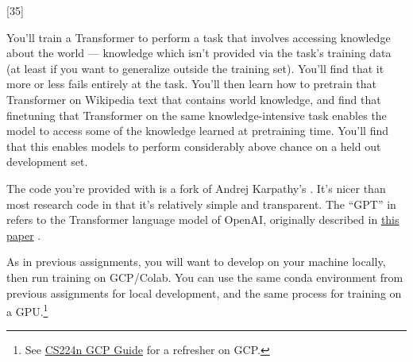 \graphicspath{ {images/} }


\newcommand{\Real}{\mathbb{R}}
\newcommand{\Int}{\mathbb{Z}}
\renewcommand\Re{\ensuremath{\text{Re}}} 



\newcommand{\henc}{\bh^{\text{enc}}}
\newcommand{\hencfw}[1]{\overrightarrow{\henc_{#1}}}
\newcommand{\hencbw}[1]{\overleftarrow{\henc_{#1}}}


\newcommand{\cenc}{\bc^{\text{enc}}}
\newcommand{\cencfw}[1]{\overrightarrow{\cenc_{#1}}}
\newcommand{\cencbw}[1]{\overleftarrow{\cenc_{#1}}}


\newcommand{\hdec}{\bh^{\text{dec}}}


\newcommand{\cdec}{\bc^{\text{dec}}}



\lstset{basicstyle=\ttfamily,columns=flexible,numbers=none}

[35]
\label{sec:char_enc}

You'll train a Transformer to perform a task that involves accessing knowledge about the world --- knowledge which isn't provided via the task's training data (at least if you want to generalize outside the training set). You'll find that it more or less fails entirely at the task.
You'll then learn how to pretrain that Transformer on Wikipedia text that contains world knowledge, and find that finetuning that Transformer on the same knowledge-intensive task enables the model to access some of the knowledge learned at pretraining time.
You'll find that this enables models to perform considerably above chance on a held out development set.

The code you're provided with is a fork of Andrej Karpathy's \href{https://github.com/karpathy/minGPT}{\mingpt}.
It's nicer than most research code in that it's relatively simple and transparent.
The ``GPT'' in \mingpt refers to the Transformer language model of OpenAI, originally described in \href{https://s3-us-west-2.amazonaws.com/openai-assets/research-covers/language-unsupervised/language_understanding_paper.pdf}{this paper} \cite{radford2018improving}.

As in previous assignments, you will want to develop on your machine locally, then run training on GCP/Colab. You can use the same conda environment from previous assignments for local development, and the same process for training on a GPU.\footnote{See \href{https://docs.google.com/document/d/1FLx0CXIn-SoExxKM1efC-E-6iBjUR4uEnpGnfemMMR0}{CS224n GCP Guide} for a refresher on GCP.}

